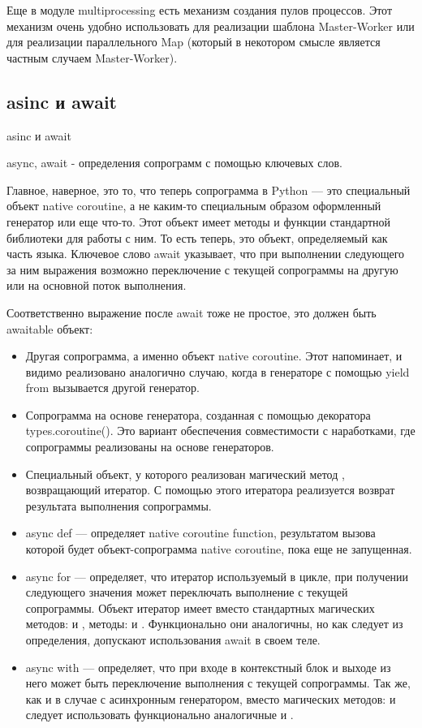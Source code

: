 Еще в модуле multiprocessing есть механизм создания пулов процессов. Этот механизм очень удобно использовать для реализации шаблона Master-Worker или для реализации параллельного Map (который в некотором смысле является частным случаем Master-Worker).

\subsection{asinc и await}

asinc и await

		async, await - определения сопрограмм с помощью ключевых слов.
	
	Главное, наверное, это то, что теперь сопрограмма в Python — это специальный объект native coroutine, а не каким-то специальным образом оформленный генератор или еще что-то. Этот объект имеет методы и функции стандартной библиотеки для работы с ним. То есть теперь, это объект, определяемый как часть языка. 
	Ключевое слово await указывает, что при выполнении следующего за ним выражения возможно переключение с текущей сопрограммы на другую или на основной поток выполнения.
	
	Соответственно выражение после await тоже не простое, это должен быть awaitable объект:

		\begin{itemize}
		\item Другая сопрограмма, а именно объект native coroutine. Этот напоминает, и видимо реализовано аналогично случаю, когда в генераторе с помощью yield from вызывается другой генератор.
		\item Сопрограмма на основе генератора, созданная с помощью декоратора types.coroutine(). Это вариант обеспечения совместимости с наработками, где сопрограммы реализованы на основе генераторов.
		\item Специальный объект, у которого реализован магический метод , возвращающий итератор. С помощью этого итератора реализуется возврат результата выполнения сопрограммы.
	\end{itemize}
	
	\begin{itemize}
		\item async def — определяет native coroutine function, результатом вызова которой будет объект-сопрограмма native coroutine, пока еще не запущенная.
		\item async for — определяет, что итератор используемый в цикле, при получении следующего значения может переключать выполнение с текущей сопрограммы. Объект итератор имеет вместо стандартных магических методов:  и , методы:  и . Функционально они аналогичны, но как следует из определения, допускают использования await в своем теле.
		\item async with — определяет, что при входе в контекстный блок и выходе из него может быть переключение выполнения с текущей сопрограммы. Так же, как и в случае с асинхронным генератором, вместо магических методов:  и  следует использовать функционально аналогичные  и .
	\end{itemize}
	
